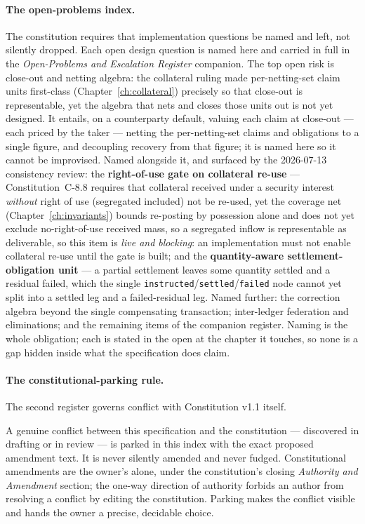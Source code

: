 \paragraph{The open-problems index.} The constitution requires that implementation
questions be named and left, not silently dropped. Each open design question is named here
and carried in full in the \emph{Open-Problems and Escalation Register} companion. The
top open risk is close-out and netting algebra: the collateral ruling made
per-netting-set claim units first-class (Chapter~\ref{ch:collateral}) precisely so that
close-out is representable, yet the algebra that nets and closes those units out is not yet
designed. It entails, on a counterparty default, valuing each claim at close-out --- each
priced by the taker --- netting the per-netting-set claims and obligations to a single
figure, and decoupling recovery from that figure; it is named here so it cannot be
improvised. Named alongside it, and surfaced by the 2026-07-13 consistency review: the
\textbf{right-of-use gate on collateral re-use} --- Constitution~C-8.8 requires that
collateral received under a security interest \emph{without} right of use (segregated
included) not be re-used, yet the coverage net (Chapter~\ref{ch:invariants}) bounds
re-posting by possession alone and does not yet exclude no-right-of-use received mass, so a
segregated inflow is representable as deliverable, so this item is \emph{live and
blocking}: an implementation must not enable collateral re-use until the gate is built;
and the \textbf{quantity-aware
settlement-obligation unit} --- a partial settlement leaves some quantity settled and a
residual failed, which the single \texttt{instructed}/\texttt{settled}/\texttt{failed} node
cannot yet split into a settled leg and a failed-residual leg. Named further: the correction
algebra beyond the single compensating transaction; inter-ledger federation and
eliminations; and the remaining items of the companion register. Naming is the whole
obligation; each is stated in the open at the chapter it touches, so none is a gap hidden
inside what the specification does claim.

\paragraph{The constitutional-parking rule.} The second register governs conflict with
Constitution v1.1 itself.

\begin{principle}
A genuine conflict between this specification and the constitution --- discovered in
drafting or in review --- is parked in this index with the exact proposed amendment text.
It is never silently amended and never fudged. Constitutional amendments are the owner's
alone, under the constitution's closing \emph{Authority and Amendment} section; the
one-way direction of authority forbids an author from resolving a conflict by editing the
constitution. Parking makes the conflict visible and hands the owner a precise, decidable
choice.
\end{principle}

